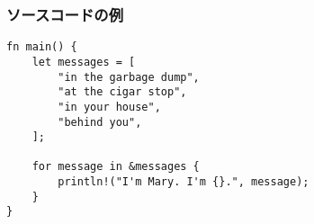 \begin{frame}[fragile]
    \frametitle{ソースコードの例}

    \begin{lstlisting}[caption={I'm mary...}]
fn main() {
    let messages = [
        "in the garbage dump",
        "at the cigar stop",
        "in your house",
        "behind you",
    ];

    for message in &messages {
        println!("I'm Mary. I'm {}.", message);
    }
}
\end{lstlisting}
\end{frame}
